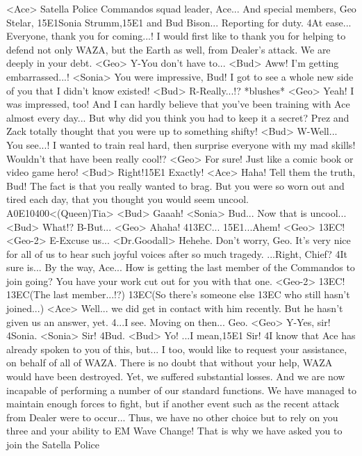 <Ace> Satella Police Commandos squad leader, Ace... 
And special members, Geo Stelar, {15}{E1}Sonia Strumm,{15}{E1} and Bud Bison... 
Reporting for duty. 
4At ease... 
Everyone, thank you for coming...! 
I would first like to thank you for helping to defend not only WAZA, but the 
Earth as well, from Dealer's attack. 
We are deeply in your debt. 
<Geo> Y-You don't have to... 
<Bud> Aww! I'm getting embarrassed...! 
<Sonia> You were impressive, Bud! 
I got to see a whole new side of you that I didn't know existed! 
<Bud> R-Really...!? 
*blushes* 
<Geo> Yeah! I was impressed, too! 
And I can hardly believe that you've been training with Ace almost every day... 
But why did you think you had to keep it a secret? 
Prez and Zack totally thought that you were up to something shifty! 
<Bud> W-Well... 
You see...! 
I wanted to train real hard, then surprise everyone with my mad skills! 
Wouldn't that have been really cool!? 
<Geo> For sure! 
Just like a comic book or video game hero! 
<Bud> Right!{15}{E1} Exactly! 
<Ace> Haha! Tell them the truth, Bud! 
The fact is that you really wanted to brag. 
But you were so worn out and tired each day, that you 
thought you would seem uncool. 
{A0}{E1}{04}{00}<(Queen)Tia> 
<Bud> Gaaah! 
<Sonia> Bud... 
Now that is uncool... 
<Bud> What!? 
B-But... 
<Geo> Ahaha! 
4{13}{EC}... 
{15}{E1}...Ahem! 
<Geo> {13}{EC}! 
<Geo-2> E-Excuse us... 
<Dr.Goodall> Hehehe. Don't worry, Geo. 
It's very nice for all of us to hear such joyful voices after so much tragedy. 
...Right, Chief? 
4It sure is... 
By the way, Ace... 
How is getting the last member of the Commandos to join going? 
You have your work cut out for you with that one. 
<Geo-2> {13}{EC}! 
{13}{EC}(The last member...!?) 
{13}{EC}(So there's someone else {13}{EC} who still hasn't joined...) 
<Ace> Well... we did get in contact with him recently. 
But he hasn't given us an answer, yet. 
4...I see. 
Moving on then... 
Geo. 
<Geo> Y-Yes, sir! 
4Sonia. 
<Sonia> Sir! 
4Bud. 
<Bud> Yo! 
...I mean,{15}{E1} Sir! 
4I know that Ace has already spoken to you of this, but... 
I too, would like to request your assistance, on behalf of all of WAZA. 
There is no doubt that without your help, WAZA would have been destroyed. 
Yet, we suffered substantial losses. 
And we are now incapable of performing a number of our standard functions. 
We have managed to maintain enough forces to fight, but 
if another event such as the recent attack from Dealer were to occur... 
Thus, we have no other choice but to rely on you 
three and your ability to EM Wave Change! 
That is why we have asked you to join the Satella Police 

